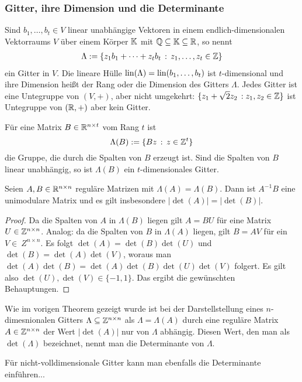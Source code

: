 	\subsubsection{Gitter, ihre Dimension und die Determinante} 
	
	Sind $b_1,\ldots,b_t \in V$ linear unabhängige Vektoren in einem endlich-dimensionalen Vektorraums $V$ über einem Körper $\mathbb K$ mit $\mathbb Q \subseteq \mathbb K \subseteq \mathbb R$, so nennt 
	\begin{align*}
		\Lambda := \{ z_1 b_1 + \cdots + z_t b_t \,: \, z_1,\ldots,z_t \in \mathbb Z \} 
	\end{align*}
	ein Gitter in $V$. Die lineare Hülle $\operatorname{lin}(\Lambda) = \operatorname{lin}(b_1,\ldots,b_t)$ ist $t$-dimensional  und ihre Dimension heißt der Rang oder die Dimension des Gitters $\Lambda$. 
	Jedes Gitter ist eine Untegruppe von $(V,+)$, aber nicht umgekehrt: $\{ z_1 + \sqrt{2} z_2 \, :  z_1,z_2 \in \mathbb Z\}$ ist Untegruppe von $(\mathbb R,+)$ aber kein Gitter.
	
	Für eine Matrix $B \in \mathbb R^{n \times t}$ vom Rang $t$ ist 
	\[
	\Lambda(B) := \{ B z \,: \, z \in \mathbb Z^t \}
	\]
	die Gruppe, die durch die Spalten von $B$ erzeugt ist. Sind die Spalten von $B$ linear unabhängig, so ist $\Lambda(B)$ ein $t$-dimensionales Gitter. 
	
	\begin{thm}
		Seien $A, B \in \mathbb R^{n \times n}$ reguläre Matrizen mit $\Lambda(A) = \Lambda(B)$. Dann ist $A^{-1} B$ eine unimodulare Matrix und es gilt insbesondere $|\det(A)| = |\det(B)|$.
	\end{thm} 
	\begin{proof}
		Da die Spalten von $A$ in $\Lambda(B)$ liegen gilt $A = B U$ für eine Matrix $U \in \mathbb Z^{n \times n}$. Analog: da die Spalten von $B$ in $\Lambda(A)$ liegen, gilt $B = A V$ für ein $V \in \ Z^{n \times n}$. Es folgt $\det(A) = \det(B) \det(U)$ und $\det(B) = \det(A) \det(V)$, woraus man $\det(A)\det(B) = \det(A) \det(B) \det(U)\det(V)$ folgert. Es gilt also $\det(U), \det(V) \in \{-1,1\}$. Das ergibt die gewünschten Behauptungen. 
	\end{proof} 
	
	Wie im vorigen Theorem gezeigt wurde ist bei der Darstellstellung eines $n$-dimesnionalen Gitters $\Lambda \subseteq  \mathbb Z^{n \times n}$ als $\Lambda = \Lambda(A)$ durch eine reguläre Matrix $A \in \mathbb Z^{n \times n}$ der Wert $|\det(A)|$ nur von $\Lambda$ abhängig. Diesen Wert, den man als $\det(\Lambda)$ bezeichnet,  nennt man die Determinante von $\Lambda$.
	
	\begin{bem}
		Für nicht-volldimensionale Gitter kann man ebenfalls die Determinante einführen...
	\end{bem} 
	

